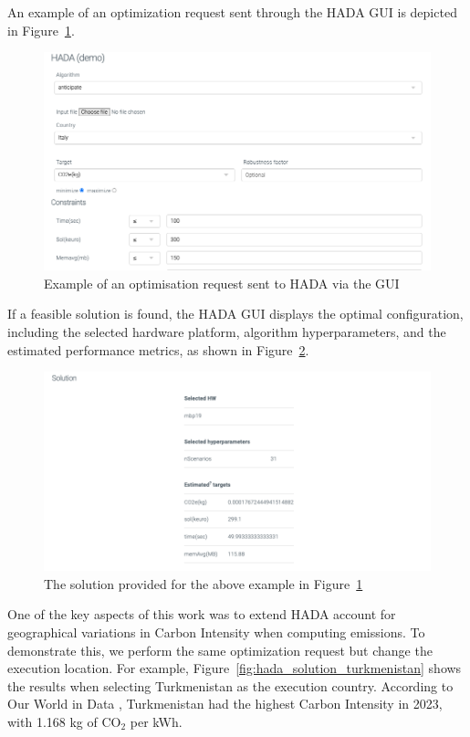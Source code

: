 \documentclass[a4paper,singleside,12pt]{report} %
\begin{document}
An example of an optimization request sent through the HADA GUI is depicted in Figure~\ref{fig:hada_optimisation_req}.

\begin{figure}[h!]
    \centering
    \includegraphics[width=\textwidth]{imgs/HADA-optimisation-req.png}
    \caption{Example of an optimisation request sent to HADA via the GUI}
    \label{fig:hada_optimisation_req}
\end{figure}

If a feasible solution is found, the HADA GUI displays the optimal configuration, including the selected hardware platform, algorithm hyperparameters, and the estimated performance metrics, as shown in Figure~\ref{fig:hada_solution}.

\begin{figure}[h!]
    \centering
    \includegraphics[width=\textwidth]{imgs/hada-solution-italy.png}
    \caption{The solution provided for the above example in Figure~\ref{fig:hada_optimisation_req}}
    \label{fig:hada_solution}
\end{figure}

One of the key aspects of this work was to extend HADA account for geographical variations in Carbon Intensity when computing emissions. To demonstrate this, we perform the same 
optimization request but change the execution location. For example, Figure~\ref{fig:hada_solution_turkmenistan} shows the results when selecting Turkmenistan as the execution country. 
According to Our World in Data \cite{ember2024carbonintensity}, Turkmenistan had the highest Carbon Intensity in 2023, with 1.168 kg of CO$_2$ per kWh.
\end{document}
